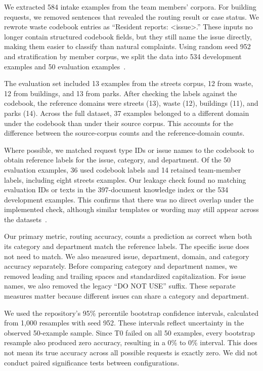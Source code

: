 \documentclass[11pt,letterpaper]{article}
\begin{document}
We extracted 584 intake examples from the team members' corpora. For building requests, we removed sentences that revealed the routing result or case status. We rewrote waste codebook entries as ``Resident reports: \textless issue\textgreater.'' These inputs no longer contain structured codebook fields, but they still name the issue directly, making them easier to classify than natural complaints. Using random seed 952 and stratification by member corpus, we split the data into 534 development examples and 50 evaluation examples~\cite{team}.

The evaluation set included 13 examples from the streets corpus, 12 from waste, 12 from buildings, and 13 from parks. After checking the labels against the codebook, the reference domains were streets (13), waste (12), buildings (11), and parks (14). Across the full dataset, 37 examples belonged to a different domain under the codebook than under their source corpus. This accounts for the difference between the source-corpus counts and the reference-domain counts.

Where possible, we matched request type IDs or issue names to the codebook to obtain reference labels for the issue, category, and department. Of the 50 evaluation examples, 36 used codebook labels and 14 retained team-member labels, including eight streets examples. Our leakage check found no matching evaluation IDs or texts in the 397-document knowledge index or the 534 development examples. This confirms that there was no direct overlap under the implemented check, although similar templates or wording may still appear across the datasets~\cite{team}.

Our primary metric, routing accuracy, counts a prediction as correct when both its category and department match the reference labels. The specific issue does not need to match. We also measured issue, department, domain, and category accuracy separately. Before comparing category and department names, we removed leading and trailing spaces and standardized capitalization. For issue names, we also removed the legacy ``DO NOT USE'' suffix. These separate measures matter because different issues can share a category and department.

We used the repository's 95\% percentile bootstrap confidence intervals, calculated from 1,000 resamples with seed 952. These intervals reflect uncertainty in the observed 50-example sample. Since T0 failed on all 50 examples, every bootstrap resample also produced zero accuracy, resulting in a 0\% to 0\% interval. This does not mean its true accuracy across all possible requests is exactly zero. We did not conduct paired significance tests between configurations.
\end{document}
